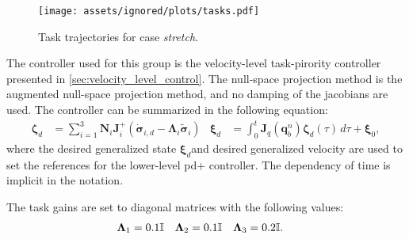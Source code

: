 \begin{figure}[!ht]
    \centering
    \texttt{[image: assets/ignored/plots/tasks.pdf]}
    \caption{Task trajectories for case \textit{stretch}.}
    \label{fig:eelume:tpc:tasks:stretch}
\end{figure}

The controller used for this group is the velocity-level task-pirority controller
presented in \autoref{sec:velocity_level_control}. The null-space projection method
is the augmented null-space projection method, and no damping of the jacobians
are used. The controller can be summarized in the following equation:
\begin{subequations}
\begin{align}
    \bm{\zeta}_d &= \sum_{i=1}^{3} \bm{N}_{i} \bm{J}_i^{+} \left( \dot{\bm{\sigma}}_{i,d} - \bm{\Lambda}_i \tilde{\bm{\sigma}}_i\right)  &
    \bm{\xi}_d &= \int_0^t \bm{J}_q(\bm{q}_b^n)\bm{\zeta}_d(\tau) \, d\tau + \bm{\xi}_0,
\end{align}
\end{subequations}
where the desired generalized state \(\bm{\xi}_d\)and desired generalized velocity
are used to set the references for the lower-level \gls{pd+} controller. The dependency
of time is implicit in the notation.

The task gains are set to diagonal matrices with the following values:
\begin{align}
    \bm{\Lambda}_1 &= 0.1 \mathbb{I} &
    \bm{\Lambda}_2 &= 0.1 \mathbb{I} &
    \bm{\Lambda}_3 &= 0.2 \mathbb{I}.
\end{align}

